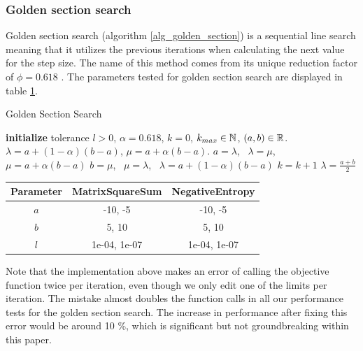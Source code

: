 \documentclass[english, 12pt, a4paper, sci, utf8, a-1b, online, table]{aaltothesis}
\newcommand{\R}{\ensuremath\mathbb{R}}
\newcommand{\N}{\ensuremath\mathbb{N}}
\begin{document}
\subsubsection{Golden section search}
\label{sect:golden_section_search}

Golden section search (algorithm \ref{alg_golden_section}) is a sequential line search meaning that it utilizes the previous iterations when calculating the next value for the step size. The name of this method comes from its unique reduction factor of $\phi = 0.618$ \cite{book:nonlinear_programming}. The parameters tested for golden section search are displayed in table \ref{tab:params_GoldenSectionSearch}.

\begin{algorithm}[H]
\caption{Golden Section Search}
\label{alg_golden_section}
\begin{algorithmic}[1]
\STATE \textbf{initialize} tolerance $l > 0$, $\alpha = 0.618$, $k = 0$, $k_{max} \in \N$, $(a, b) \in \R$.
\STATE $\lambda = a + (1 - \alpha) (b - a)$, $\mu = a + \alpha (b - a)$.
    \IF{$\theta(\lambda) > \theta(\mu)$}
        \STATE $a = \lambda$, \ $\lambda = \mu$, \ $\mu = a + \alpha (b - a)$
    \ELSE
        \STATE $b = \mu$, \ $\mu = \lambda$, \ $\lambda = a + (1 - \alpha) (b - a)$
    \ENDIF
    \STATE $k = k + 1$
\ENDWHILE
\RETURN $\lambda = \frac{a + b}{2}$
\end{algorithmic}
\end{algorithm}

\begin{table}[H]
\label{tab:params_GoldenSectionSearch}
\centering
{}
\begin{tabular}{|c|c|c|}
\hline
\rowcolor{gray!25}
Parameter & MatrixSquareSum & NegativeEntropy \\
\hline
$a$ & -10, -5 & -10, -5 \\
$b$ & 5, 10 & 5, 10 \\
$l$ & 1e-04, 1e-07 & 1e-04, 1e-07 \\
\hline
\end{tabular}
\end{table}


Note that the implementation above makes an error of calling the objective function twice per iteration, even though we only edit one of the limits per iteration. The mistake almost doubles the function calls in all our performance tests for the golden section search. The increase in performance after fixing this error would be around 10 \%, which is significant but not groundbreaking within this paper. 
\end{document}
